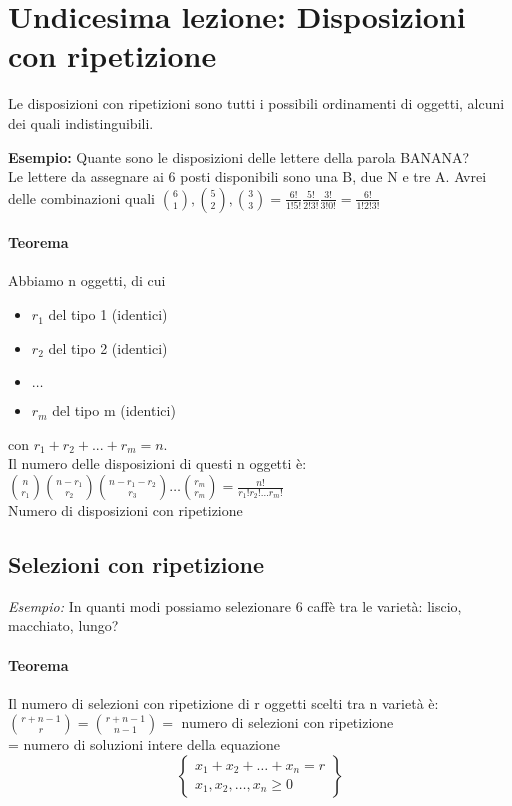 \section{Undicesima lezione: Disposizioni con ripetizione}

Le disposizioni con ripetizioni sono tutti i possibili ordinamenti di oggetti, alcuni dei quali indistinguibili. 

\noindent
\textbf{Esempio:} Quante sono le disposizioni delle lettere della parola BANANA? \\
Le lettere da assegnare ai 6 posti disponibili sono una B, due N e tre A. Avrei delle combinazioni quali
\smallskip
\( \binom{6}{1}, \binom{5}{2}, \binom{3}{3} = \frac{6!}{1! 5!} \frac{5!}{2! 3!} \frac{3!}{3! 0!} = \frac{6!}{1! 2! 3!}\)

\paragraph{Teorema} 
Abbiamo n oggetti, di cui
\begin{itemize}
    \item $r_1$ del tipo 1 (identici)
    \item $r_2$ del tipo 2 (identici)
    \item $\dots$
    \item $r_m$ del tipo m (identici)
\end{itemize}
con $r_1 + r_2 + ... + r_m = n$. \\
Il numero delle disposizioni di questi n oggetti è:\\
\smallskip
\( \binom{n}{r_1} \binom{n-r_1}{r_2} \binom{n-r_1-r_2}{r_3} \dots  \binom{r_m}{r_m} = \frac{n!}{r_1 ! r_2 ! \dots r_m !} \) \\
Numero di disposizioni con ripetizione 


\subsection{Selezioni con ripetizione}
\textit{Esempio:} In quanti modi possiamo selezionare 6 caffè tra le varietà: liscio, macchiato, lungo? \\


\paragraph{Teorema}
Il numero di selezioni con ripetizione di r oggetti scelti tra n varietà è: \\
\smallskip
\( \binom{r + n -1}{r}= \binom{r+n-1}{n-1}= \) numero di selezioni con ripetizione \\
= numero di soluzioni intere della equazione
\[ \left\{ 
    \begin{array}{rcl} 
    x_1 + x_2 + \dots + x_n = r \\
    x_1, x_2, \dots, x_n \geq 0
\end{array} 
\right\} \]

